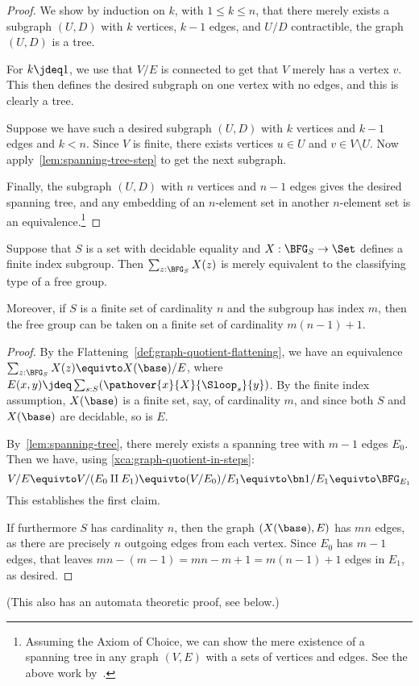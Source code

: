 \begin{proof}
  We show by induction on $k$, with $1\le k\le n$, that there merely exists
  a subgraph $(U,D)$ with $k$ vertices, $k-1$ edges, and $U/D$ contractible,
  \ie the graph $(U,D)$ is a tree.

  For $k\jdeq 1$, we use that $V/E$ is connected to get that $V$ merely has a vertex $v$.
  This then defines the desired subgraph on one vertex with no edges,
  and this is clearly a tree.

  Suppose we have such a desired subgraph $(U,D)$
  with $k$ vertices and $k-1$ edges and $k<n$.
  Since $V$ is finite, there exists vertices $u \in U$ and $v \in V \setminus U$.
  Now apply~\cref{lem:spanning-tree-step} to get the next subgraph.

  Finally, the subgraph $(U,D)$ with $n$ vertices and $n-1$ edges gives
  the desired spanning tree, and any embedding of an $n$-element set
  in another $n$-element set is an equivalence.\footnote{%
    Assuming the Axiom of Choice, we can show the mere existence of a spanning tree
    in any graph $(V,E)$ with a sets of vertices and edges.
    See the above work by~\citeauthor{Swan2022}.}
\end{proof}

\begin{theorem}
  Suppose that $S$ is a set with decidable equality and
  $X : \BFG_S \to \Set$ defines a finite index subgroup.
  Then $\sum_{z:\BFG_S}X(z)$ is merely equivalent to the classifying type of a free group.

  Moreover, if $S$ is a finite set of cardinality $n$ and the subgroup has index $m$,
  then the free group can be taken on a finite set of cardinality $m(n-1)+1$.
\end{theorem}
\begin{proof}
  By the Flattening~\cref{def:graph-quotient-flattening},
  we have an equivalence $\sum_{z:\BFG_S}X(z) \equivto X(\base)/E$,
  where $E(x,y) \jdeq \sum_{s:S}(\pathover{x}{X}{\Sloop_s}{y})$.
  By the finite index assumption, $X(\base)$ is a finite set,
  say, of cardinality $m$,
  and since both $S$ and $X(\base)$ are decidable, so is $E$.

  By~\cref{lem:spanning-tree}, there merely exists a spanning tree with
  $m-1$ edges $E_0$. Then we have,
  using \cref{xca:graph-quotient-in-steps}:
  \[
    V/E \equivto V/(E_0\amalg E_1) \equivto (V/E_0)/E_1
    \equivto \bn 1/E_1 \equivto \BFG_{E_1}
  \]
  This establishes the first claim.

  If furthermore $S$ has cardinality $n$, then the graph $(X(\base),E)$
  has $mn$ edges, as there are precisely $n$ outgoing edges from each vertex.
  Since $E_0$ has $m-1$ edges,
  that leaves $mn - (m-1) = mn-m+1 = m(n-1)+1$ edges in $E_1$, as desired.
\end{proof}
(This also has an automata theoretic proof, see below.)

